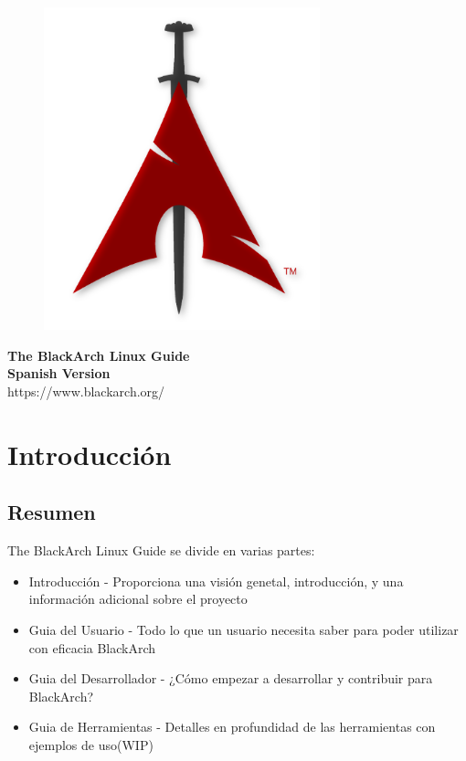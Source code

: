 \documentclass[a4paper, oneside, 11pt]{book}
\begin{document}
\pagestyle{empty}
\begin{center}
\begin{figure}[htbp]
\centering
\vspace{0.5cm}
\includegraphics[width=8cm]{images/logo.png}
\label{fig:logo}
\end{figure}
\vspace{0.5cm}
\Huge{\textbf{The BlackArch Linux Guide}}\\
\vspace{0.5cm}
\Large{\textbf{Spanish Version}}\\
\vspace{1cm}
\Large{\color{red}https://www.blackarch.org/}\\
\vspace{0.5cm}
\end{center}
\newpage
\tableofcontents
\newpage
\pagestyle{fancy}


\chapter{Introducci\'on}

\section{Resumen}
The BlackArch Linux Guide se divide en varias partes:
\begin{itemize}
\item Introducci\'on - Proporciona una visi\'on genetal, introducci\'on, y una informaci\'on adicional sobre el proyecto
\item Guia del Usuario - Todo lo que un usuario necesita saber para poder utilizar con eficacia BlackArch
\item Guia del Desarrollador - ¿Cómo empezar a desarrollar y contribuir para BlackArch?
\item Guia de Herramientas - Detalles en profundidad de las herramientas con ejemplos de uso(WIP)
\end{itemize}
\end{document}
